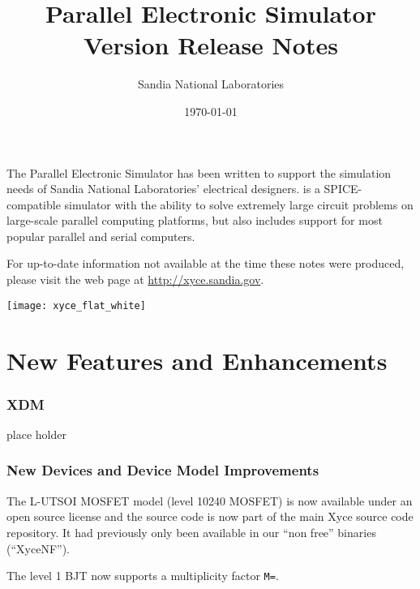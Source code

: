 \documentclass[letterpaper]{scrartcl}
\title{\XyceTitle{} Parallel Electronic Simulator\\
Version \XyceVersionVar{} Release Notes}
\author{ Sandia National Laboratories}
\date{\today}
\begin{document}
\maketitle

The \XyceTM{} Parallel Electronic Simulator has been written to support the
simulation needs of Sandia National Laboratories' electrical designers.
\XyceTM{} is a SPICE-compatible simulator with the ability to solve extremely
large circuit problems on large-scale parallel computing platforms, but also
includes support for most popular parallel and serial computers.

For up-to-date information not available at the time these notes were produced,
please visit the \XyceTM{} web page at
{\color{XyceDeepRed}\url{http://xyce.sandia.gov}}.

\tableofcontents
\vspace*{\fill}
\parbox{\textwidth}
{
  \hfill
  \texttt{[image: xyce\_flat\_white]}
}


\newpage
\section{New Features and Enhancements}

\subsubsection*{XDM}
\begin{XyceItemize}
  \item place holder
\end{XyceItemize}

\subsubsection*{New Devices and Device Model Improvements}
\begin{XyceItemize}
  \item The L-UTSOI MOSFET model (level 10240 MOSFET) is now available
    under an open source license and the source code is now part of
    the main Xyce source code repository.  It had previously only been
    available in our ``non free'' binaries (``XyceNF'').
  \item The level 1 BJT now supports a multiplicity factor \texttt{M=}.
\end{XyceItemize}
\end{document}
